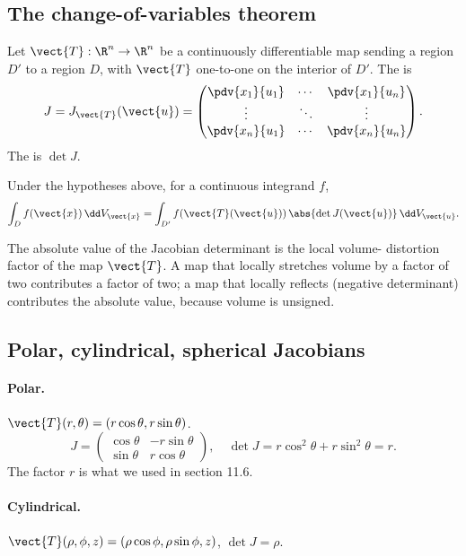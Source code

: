 \subsection{The change-of-variables theorem}

Let $\vect{T}: \R^{n} \to \R^{n}$ be a continuously differentiable
map sending a region $D'$ to a region $D$, with $\vect{T}$
one-to-one on the interior of $D'$. The 
is
\[
J = J_{\vect{T}}(\vect{u}) = \begin{pmatrix}
\pdv{x_{1}}{u_{1}} & \cdots & \pdv{x_{1}}{u_{n}} \\
\vdots & \ddots & \vdots \\
\pdv{x_{n}}{u_{1}} & \cdots & \pdv{x_{n}}{u_{n}}
\end{pmatrix}.
\]
The  is $\det J$.

\begin{theorem}
Under the hypotheses above, for a continuous integrand $f$,
\[
\int_{D} f(\vect{x}) \,\dd V_{\vect{x}} =
\int_{D'} f(\vect{T}(\vect{u}))\,\abs{\det J(\vect{u})}\,
\dd V_{\vect{u}}.
\]
\end{theorem}

The absolute value of the Jacobian determinant is the local volume-
distortion factor of the map $\vect{T}$. A map that locally stretches
volume by a factor of two contributes a factor of two; a map that
locally reflects (negative determinant) contributes the absolute
value, because volume is unsigned.

\subsection{Polar, cylindrical, spherical Jacobians}

\paragraph{Polar.} $\vect{T}(r, \theta) = (r\cos\theta, r\sin\theta)$.
\[
J = \begin{pmatrix} \cos\theta & -r\sin\theta \\
\sin\theta & r\cos\theta \end{pmatrix}, \quad
\det J = r\cos^{2}\theta + r\sin^{2}\theta = r.
\]
The factor $r$ is what we used in section 11.6.

\paragraph{Cylindrical.} $\vect{T}(\rho, \phi, z) =
(\rho\cos\phi, \rho\sin\phi, z)$, $\det J = \rho$.

